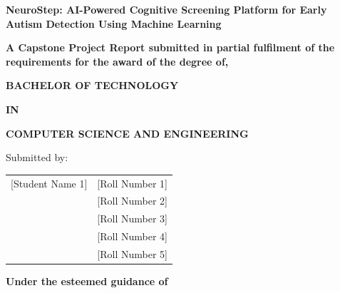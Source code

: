 \documentclass[12pt,letterpaper]{article}
\begin{document}

\begin{titlepage}
\begin{center}

\vspace*{1cm}


\vspace{1cm}

{\fontsize{16}{19}\selectfont\textbf{NeuroStep: AI-Powered Cognitive Screening Platform for Early Autism Detection Using Machine Learning}}

\vspace{0.5cm}

{\fontsize{12}{14}\selectfont\textbf{A Capstone Project Report submitted in partial fulfilment of the\\requirements for the award of the degree of,}}

\vspace{0.5cm}

{\fontsize{14}{17}\selectfont\textbf{BACHELOR OF TECHNOLOGY}}

{\fontsize{14}{17}\selectfont\textbf{IN}}

{\fontsize{14}{17}\selectfont\textbf{COMPUTER SCIENCE AND ENGINEERING}}

\vspace{1cm}

{\fontsize{12}{14}\selectfont Submitted by:}

\vspace{0.5cm}

\begin{table}[h]
\centering
\begin{tabular}{cc}
[Student Name 1] & [Roll Number 1] \\
[Student Name 2] & [Roll Number 2] \\
[Student Name 3] & [Roll Number 3] \\
[Student Name 4] & [Roll Number 4] \\
[Student Name 5] & [Roll Number 5] \\
\end{tabular}
\end{table}

\vspace{1cm}

{\fontsize{12}{14}\selectfont\textbf{Under the esteemed guidance of}}


\end{center}
\end{titlepage}
\end{document}
